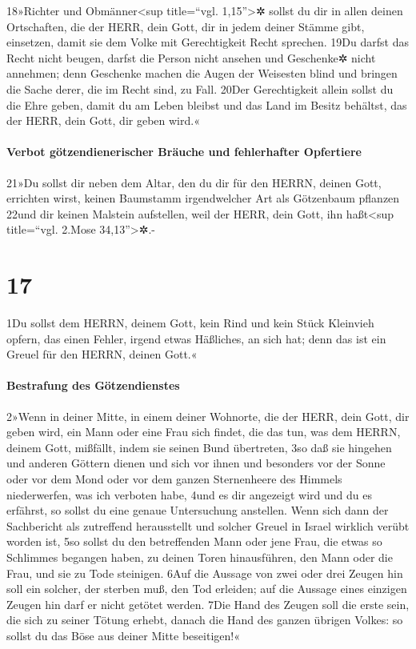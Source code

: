 18»Richter und Obmänner\textless sup title=``vgl. 1,15''\textgreater✲
sollst du dir in allen deinen Ortschaften, die der HERR, dein Gott, dir
in jedem deiner Stämme gibt, einsetzen, damit sie dem Volke mit
Gerechtigkeit Recht sprechen. 19Du darfst das Recht nicht beugen, darfst
die Person nicht ansehen und Geschenke✲ nicht annehmen; denn Geschenke
machen die Augen der Weisesten blind und bringen die Sache derer, die im
Recht sind, zu Fall. 20Der Gerechtigkeit allein sollst du die Ehre
geben, damit du am Leben bleibst und das Land im Besitz behältst, das
der HERR, dein Gott, dir geben wird.«

\hypertarget{verbot-guxf6tzendienerischer-bruxe4uche-und-fehlerhafter-opfertiere}{%
\paragraph{Verbot götzendienerischer Bräuche und fehlerhafter
Opfertiere}\label{verbot-guxf6tzendienerischer-bruxe4uche-und-fehlerhafter-opfertiere}}

21»Du sollst dir neben dem Altar, den du dir für den HERRN, deinen Gott,
errichten wirst, keinen Baumstamm irgendwelcher Art als Götzenbaum
pflanzen 22und dir keinen Malstein aufstellen, weil der HERR, dein Gott,
ihn haßt\textless sup title=``vgl. 2.Mose 34,13''\textgreater✲.-

\hypertarget{section-16}{%
\section{17}\label{section-16}}

1Du sollst dem HERRN, deinem Gott, kein Rind und kein Stück Kleinvieh
opfern, das einen Fehler, irgend etwas Häßliches, an sich hat; denn das
ist ein Greuel für den HERRN, deinen Gott.«

\hypertarget{bestrafung-des-guxf6tzendienstes}{%
\paragraph{Bestrafung des
Götzendienstes}\label{bestrafung-des-guxf6tzendienstes}}

2»Wenn in deiner Mitte, in einem deiner Wohnorte, die der HERR, dein
Gott, dir geben wird, ein Mann oder eine Frau sich findet, die das tun,
was dem HERRN, deinem Gott, mißfällt, indem sie seinen Bund übertreten,
3so daß sie hingehen und anderen Göttern dienen und sich vor ihnen und
besonders vor der Sonne oder vor dem Mond oder vor dem ganzen
Sternenheere des Himmels niederwerfen, was ich verboten habe, 4und es
dir angezeigt wird und du es erfährst, so sollst du eine genaue
Untersuchung anstellen. Wenn sich dann der Sachbericht als zutreffend
herausstellt und solcher Greuel in Israel wirklich verübt worden ist,
5so sollst du den betreffenden Mann oder jene Frau, die etwas so
Schlimmes begangen haben, zu deinen Toren hinausführen, den Mann oder
die Frau, und sie zu Tode steinigen. 6Auf die Aussage von zwei oder drei
Zeugen hin soll ein solcher, der sterben muß, den Tod erleiden; auf die
Aussage eines einzigen Zeugen hin darf er nicht getötet werden. 7Die
Hand des Zeugen soll die erste sein, die sich zu seiner Tötung erhebt,
danach die Hand des ganzen übrigen Volkes: so sollst du das Böse aus
deiner Mitte beseitigen!«

